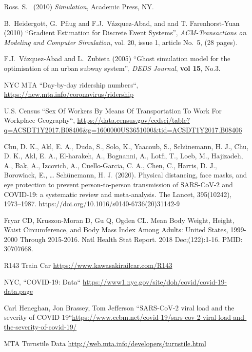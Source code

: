 \documentclass[12pt]{article}
\begin{document}
\clearpage
\begin{thebibliography}{00}

 Ross. S.~ (2010) {\em Simulation}, Academic Press, NY.

  B.~Heidergott, G.~Pflug and F.J.~V\'azquez-Abad, and and T. Farenhorst-Yuan (2010) 
``Gradient Estimation for Discrete Event Systems'',  {\em ACM-Transactions on Modeling and Computer Simulation},  vol. 20, issue 1, article  No.~5,  (28 pages).

     F.J.~V\'azquez-Abad and L.~Zubieta (2005) ``Ghost simulation model for
the optimisation of an urban subway system'', {\em DEDS Journal}, {\bf vol 15}, No.3.

 NYC MTA ``Day-by-day ridership numbers``,  \url{https://new.mta.info/coronavirus/ridership}

 U.S. Census ``Sex Of Workers By Means Of Transportation To Work For Workplace Geography``, \url{https://data.census.gov/cedsci/table?q=ACSDT1Y2017.B08406&g=1600000US3651000&tid=ACSDT1Y2017.B08406}

 Chu, D. K., Akl, E. A., Duda, S., Solo, K., Yaacoub, S., Schünemann, H. J., Chu, D. K., Akl, E. A., El-harakeh, A., Bognanni, A., Lotfi, T., Loeb, M., Hajizadeh, A., Bak, A., Izcovich, A., Cuello-Garcia, C. A., Chen, C., Harris, D. J., Borowiack, E., … Schünemann, H. J. (2020). Physical distancing, face masks, and eye protection to prevent person-to-person transmission of SARS-CoV-2 and COVID-19: a systematic review and meta-analysis. The Lancet, 395(10242), 1973–1987. https://doi.org/10.1016/s0140-6736(20)31142-9

 Fryar CD, Kruszon-Moran D, Gu Q, Ogden CL. Mean Body Weight, Height, Waist Circumference, and Body Mass Index Among Adults: United States, 1999-2000 Through 2015-2016. Natl Health Stat Report. 2018 Dec;(122):1-16. PMID: 30707668.

 R143 Train Car \url{https://www.kawasakirailcar.com/R143}

 NYC, ``COVID-19: Data`` \url{https://www1.nyc.gov/site/doh/covid/covid-19-data.page}

 Carl Heneghan, Jon Brassey, Tom Jefferson ``SARS-CoV-2 viral load and the severity of COVID-19``\url{https://www.cebm.net/covid-19/sars-cov-2-viral-load-and-the-severity-of-covid-19/}


 MTA Turnstile Data \url{http://web.mta.info/developers/turnstile.html}

\end{thebibliography}
\end{document}
